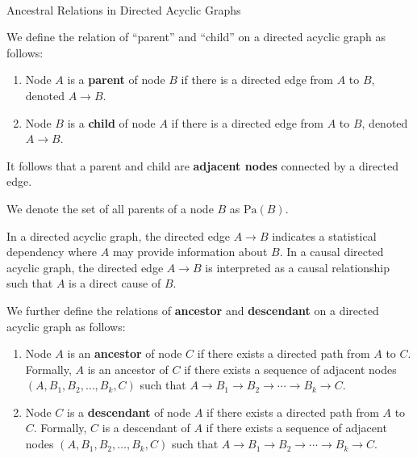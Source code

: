 \documentclass[
  single column]{article}
\makeatletter
\let\oldparagraph\paragraph
\renewcommand{\paragraph}{
    \@ifstar
      \xxxParagraphStar
      \xxxParagraphNoStar
  }
\newcommand{\xxxParagraphStar}[1]{\oldparagraph*{#1}\mbox{}}
\newcommand{\xxxParagraphNoStar}[1]{\oldparagraph{#1}\mbox{}}
\providecommand{\tightlist}{%
  \setlength{\itemsep}{0pt}\setlength{\parskip}{0pt}}\usepackage{longtable,booktabs,array}
\makeatother
\begin{document}
\paragraph{Ancestral Relations in Directed Acyclic
Graphs}\label{ancestral-relations-in-directed-acyclic-graphs}

We define the relation of ``parent'' and ``child'' on a directed acyclic
graph as follows:

\begin{enumerate}
\def\labelenumi{\arabic{enumi}.}
\tightlist
\item
  Node \(A\) is a \textbf{parent} of node \(B\) if there is a directed
  edge from \(A\) to \(B\), denoted \(A \rightarrow B\).
\item
  Node \(B\) is a \textbf{child} of node \(A\) if there is a directed
  edge from \(A\) to \(B\), denoted \(A \rightarrow B\).
\end{enumerate}

It follows that a parent and child are \textbf{adjacent nodes} connected
by a directed edge.

We denote the set of all parents of a node \(B\) as \(\text{Pa}(B)\).

In a directed acyclic graph, the directed edge \(A \rightarrow B\)
indicates a statistical dependency where \(A\) may provide information
about \(B\). In a causal directed acyclic graph, the directed edge
\(A \rightarrow B\) is interpreted as a causal relationship such that
\(A\) is a direct cause of \(B\).

We further define the relations of \textbf{ancestor} and
\textbf{descendant} on a directed acyclic graph as follows:

\begin{enumerate}
\def\labelenumi{\arabic{enumi}.}
\tightlist
\item
  Node \(A\) is an \textbf{ancestor} of node \(C\) if there exists a
  directed path from \(A\) to \(C\). Formally, \(A\) is an ancestor of
  \(C\) if there exists a sequence of adjacent nodes
  \((A, B_1, B_2, \ldots, B_k, C)\) such that
  \(A \rightarrow B_1 \rightarrow B_2 \rightarrow \cdots \rightarrow B_k \rightarrow C\).
\item
  Node \(C\) is a \textbf{descendant} of node \(A\) if there exists a
  directed path from \(A\) to \(C\). Formally, \(C\) is a descendant of
  \(A\) if there exists a sequence of adjacent nodes
  \((A, B_1, B_2, \ldots, B_k, C)\) such that
  \(A \rightarrow B_1 \rightarrow B_2 \rightarrow \cdots \rightarrow B_k \rightarrow C\).
\end{enumerate}
\end{document}
